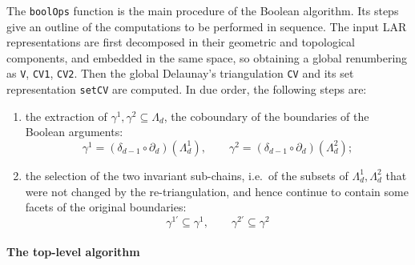 \documentclass[11pt,oneside]{article}	%
\begin{document}
The \texttt{boolOps} function is the main procedure of the Boolean algorithm.
Its steps give an outline of the computations to be performed in sequence. The input LAR representations are first decomposed in their geometric and topological components, and embedded in the same space, so obtaining a global renumbering as \texttt{V}, \texttt{CV1}, \texttt{CV2}. Then the global Delaunay's triangulation \texttt{CV} and its set representation \texttt{setCV} are computed. In due order, the following steps are:  
\begin{enumerate}
\item 
the extraction of $\gamma^1,\gamma^2\subseteq\Lambda_d$, the coboundary of the boundaries of the Boolean arguments:
\[
\gamma^1 = (\delta_{d-1}\circ\partial_d) (\Lambda_d^1), \qquad
\gamma^2 = (\delta_{d-1}\circ\partial_d) (\Lambda_d^2);
\]  
\item 
the selection of the two invariant sub-chains, i.e.~of the subsets of $\Lambda_d^1, \Lambda_d^2$ that were not changed by the re-triangulation, and hence continue to contain some facets of the original boundaries:
\[
\gamma^{1'} \subseteq \gamma^1, \qquad
\gamma^{2'} \subseteq \gamma^2
\]
\end{enumerate}

\paragraph{The top-level algorithm}
\end{document}
